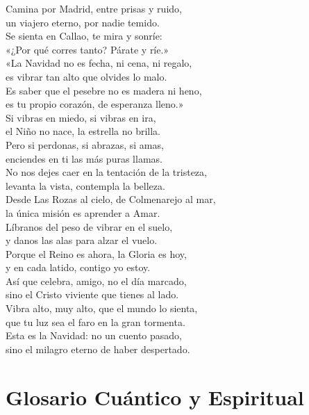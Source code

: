 \documentclass[12pt,twoside,openany]{book}
\begin{document}
Camina por Madrid, entre prisas y ruido,\\
un viajero eterno, por nadie temido.\\
Se sienta en Callao, te mira y sonríe:\\
«¿Por qué corres tanto? Párate y ríe.»\\

«La Navidad no es fecha, ni cena, ni regalo,\\
es vibrar tan alto que olvides lo malo.\\
Es saber que el pesebre no es madera ni heno,\\
es tu propio corazón, de esperanza lleno.»\\

Si vibras en miedo, si vibras en ira,\\
el Niño no nace, la estrella no brilla.\\
Pero si perdonas, si abrazas, si amas,\\
enciendes en ti las más puras llamas.\\

No nos dejes caer en la tentación de la tristeza,\\
levanta la vista, contempla la belleza.\\
Desde Las Rozas al cielo, de Colmenarejo al mar,\\
la única misión es aprender a Amar.\\

Líbranos del peso de vibrar en el suelo,\\
y danos las alas para alzar el vuelo.\\
Porque el Reino es ahora, la Gloria es hoy,\\
y en cada latido, contigo yo estoy.\\

Así que celebra, amigo, no el día marcado,\\
sino el Cristo viviente que tienes al lado.\\
Vibra alto, muy alto, que el mundo lo sienta,\\
que tu luz sea el faro en la gran tormenta.\\

Esta es la Navidad: no un cuento pasado,\\
sino el milagro eterno de haber despertado.\\

\newpage
\chapter{Glosario Cuántico y Espiritual}
\end{document}
